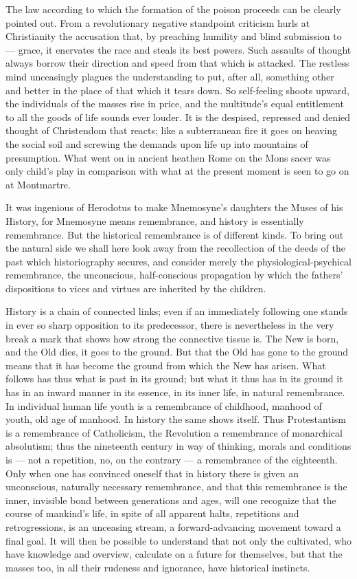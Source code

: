 \documentclass[12pt,a4paper,openany]{book}
\newcommand{\opage}[1]{\marginnote{\footnotesize\textit{[#1]}}}
\begin{document}
The law according to which the formation of the poison proceeds can
be clearly pointed out. From a revolutionary negative standpoint
criticism hurls at Christianity the accusation
that, by preaching humility and blind
submission to --- grace, it enervates the race and
steals its best powers. Such assaults of thought
always borrow their direction and speed from that which
is attacked. The restless mind unceasingly plagues the understanding
to put, after all, something other and
better in the place of that which it tears down. So
self-feeling shoots upward, the individuals of the masses rise in price, and
the multitude's equal entitlement to all the goods of life sounds
ever louder. It is the despised, repressed and
denied thought of Christendom that reacts; like a subterranean
fire it goes on heaving the social soil
and screwing the demands upon life up into mountains of presumption.
What went on in ancient heathen Rome on the Mons
sacer was only child's play in comparison with what
at the present moment is seen to go on at Montmartre.

It was ingenious of Herodotus to make Mnemosyne's
\setcounter{footnote}{0}%
\opage{313}daughters the Muses of his History, for Mnemosyne means
remembrance, and history is essentially remembrance. But the
historical remembrance is of different kinds. To bring out
the natural side we shall here look away from the recollection
of the deeds of the past which historiography
secures, and consider merely the physiological-psychical remembrance,
the unconscious, half-conscious propagation by which the fathers'
dispositions to vices and virtues are inherited
by the children.

History is a chain of connected links;
even if an immediately following one stands in ever so
sharp opposition to its predecessor, there is nevertheless in
the very break a mark that shows how strong the connective tissue
is. The New is born, and the Old dies, it goes
to the ground. But that the Old has gone to the ground means
that it has become the ground from which the New has
arisen. What follows has thus what is past
in its ground; but what it thus has in its ground
it has in an inward manner in its essence, in its inner life,
in natural remembrance. In individual human life
youth is a remembrance of childhood, manhood
of youth, old age of manhood. In history
the same shows itself. Thus Protestantism
is a remembrance of Catholicism, the Revolution a remembrance
of monarchical absolutism; thus the nineteenth
century in way of thinking, morals and conditions is --- not
a repetition, no, on the contrary --- a remembrance of the
eighteenth. Only when one has convinced oneself that in
history there is given an unconscious, naturally necessary remembrance,
and that this remembrance is the inner, invisible bond
between generations and ages, will one recognize
\setcounter{footnote}{0}%
\opage{314}that the course of mankind's life, in spite of all apparent
halts, repetitions and retrogressions, is an unceasing
stream, a forward-advancing movement toward a final
goal. It will then be possible to understand that not only the cultivated,
who have knowledge and overview, calculate on a
future for themselves, but that the masses too, in all their rudeness and
ignorance, have historical instincts.
\end{document}
